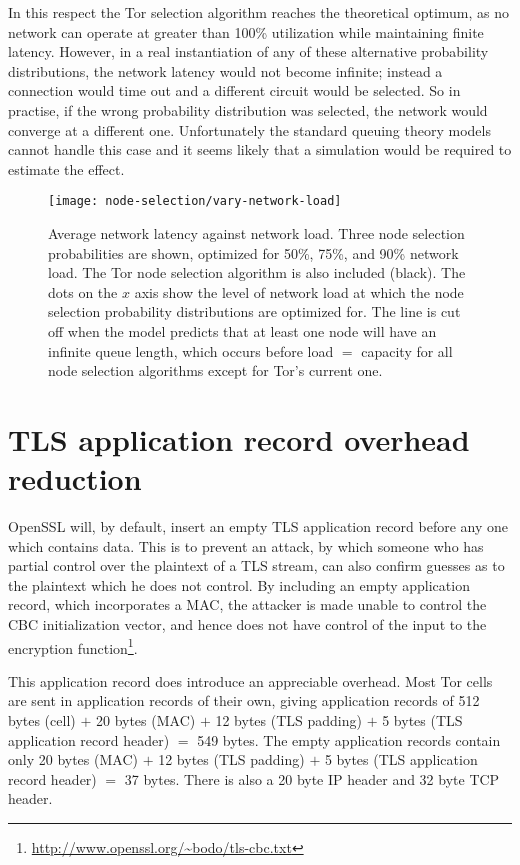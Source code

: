 \documentclass{article}
\begin{document}
In this respect the Tor selection algorithm reaches the theoretical optimum, as no network can operate at greater than 100\% utilization while maintaining finite latency.
However, in a real instantiation of any of these alternative probability distributions, the network latency would not become infinite; instead a connection would time out and a different circuit would be selected.
So in practise, if the wrong probability distribution was selected, the network would converge at a different one.
Unfortunately the standard queuing theory models cannot handle this case and it seems likely that a simulation would be required to estimate the effect.

\begin{figure}
\texttt{[image: node-selection/vary-network-load]}
\caption{Average network latency against network load. Three node selection probabilities are shown, optimized for 50\%, 75\%, and 90\% network load. The Tor node selection algorithm is also included (black). The dots on the $x$ axis show the level of network load at which the node selection probability distributions are optimized for. The line is cut off when the model predicts that at least one node will have an infinite queue length, which occurs before load $=$ capacity for all node selection algorithms except for Tor's current one.}
\label{fig:vary-load}
\end{figure}

\section{TLS application record overhead reduction}

OpenSSL will, by default, insert an empty TLS application record before any one which contains data.
This is to prevent an attack, by which someone who has partial control over the plaintext of a TLS stream, can also confirm guesses as to the plaintext which he does not control.
By including an empty application record, which incorporates a MAC, the attacker is made unable to control the CBC initialization vector, and hence does not have control of the input to the encryption function\footnote{\url{http://www.openssl.org/~bodo/tls-cbc.txt}}.

This application record does introduce an appreciable overhead.
Most Tor cells are sent in application records of their own, giving application records of 512 bytes (cell) $+$ 20 bytes (MAC) $+$ 12 bytes (TLS padding) $+$ 5 bytes (TLS application record header) $=$ 549 bytes.
The empty application records contain only 20 bytes (MAC) $+$ 12 bytes (TLS padding) $+$ 5 bytes (TLS application record header) $=$ 37 bytes.
There is also a 20 byte IP header and 32 byte TCP header.
\end{document}
